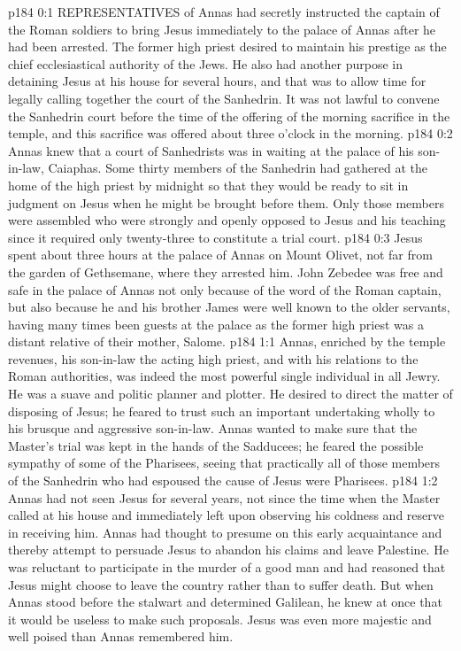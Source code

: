 \vs p184 0:1 REPRESENTATIVES of Annas had secretly instructed the captain of the Roman soldiers to bring Jesus immediately to the palace of Annas after he had been arrested. The former high priest desired to maintain his prestige as the chief ecclesiastical authority of the Jews. He also had another purpose in detaining Jesus at his house for several hours, and that was to allow time for legally calling together the court of the Sanhedrin. It was not lawful to convene the Sanhedrin court before the time of the offering of the morning sacrifice in the temple, and this sacrifice was offered about three o’clock in the morning.
\vs p184 0:2 Annas knew that a court of Sanhedrists was in waiting at the palace of his son\hyp{}in\hyp{}law, Caiaphas. Some thirty members of the Sanhedrin had gathered at the home of the high priest by midnight so that they would be ready to sit in judgment on Jesus when he might be brought before them. Only those members were assembled who were strongly and openly opposed to Jesus and his teaching since it required only twenty\hyp{}three to constitute a trial court.
\vs p184 0:3 Jesus spent about three hours at the palace of Annas on Mount Olivet, not far from the garden of Gethsemane, where they arrested him. John Zebedee was free and safe in the palace of Annas not only because of the word of the Roman captain, but also because he and his brother James were well known to the older servants, having many times been guests at the palace as the former high priest was a distant relative of their mother, Salome.
\vs p184 1:1 Annas, enriched by the temple revenues, his son\hyp{}in\hyp{}law the acting high priest, and with his relations to the Roman authorities, was indeed the most powerful single individual in all Jewry. He was a suave and politic planner and plotter. He desired to direct the matter of disposing of Jesus; he feared to trust such an important undertaking wholly to his brusque and aggressive son\hyp{}in\hyp{}law. Annas wanted to make sure that the Master’s trial was kept in the hands of the Sadducees; he feared the possible sympathy of some of the Pharisees, seeing that practically all of those members of the Sanhedrin who had espoused the cause of Jesus were Pharisees.
\vs p184 1:2 Annas had not seen Jesus for several years, not since the time when the Master called at his house and immediately left upon observing his coldness and reserve in receiving him. Annas had thought to presume on this early acquaintance and thereby attempt to persuade Jesus to abandon his claims and leave Palestine. He was reluctant to participate in the murder of a good man and had reasoned that Jesus might choose to leave the country rather than to suffer death. But when Annas stood before the stalwart and determined Galilean, he knew at once that it would be useless to make such proposals. Jesus was even more majestic and well poised than Annas remembered him.
